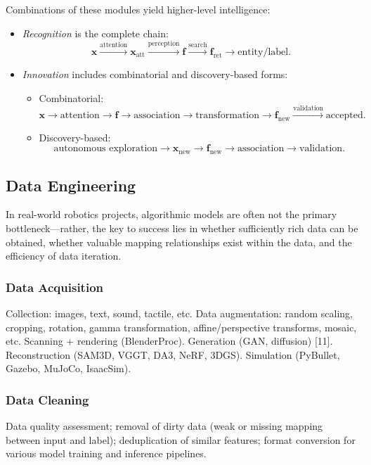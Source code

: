 \documentclass[12pt,a4paper]{article}
\begin{document}
Combinations of these modules yield higher-level intelligence:
\begin{itemize}
\item \emph{Recognition} is the complete chain:
\[
\mathbf{x} \xrightarrow{\text{attention}} \mathbf{x}_{\text{att}} \xrightarrow{\text{perception}} \mathbf{f} \xrightarrow{\text{search}} \mathbf{f}_{\text{ret}} \to \text{entity/label}.
\]
\item \emph{Innovation} includes combinatorial and discovery-based forms:
\begin{itemize}
\item Combinatorial: 
\[
\mathbf{x} \to \text{attention} \to \mathbf{f} \to \text{association} \to \text{transformation} \to \mathbf{f}_{\text{new}} \xrightarrow{\text{validation}} \text{accepted}.
\]
\item Discovery-based: 
\[
\text{autonomous exploration} \to \mathbf{x}_{\text{new}} \to \mathbf{f}_{\text{new}} \to \text{association} \to \text{validation}.
\]
\end{itemize}
\end{itemize}

\subsection{Data Engineering}
In real-world robotics projects, algorithmic models are often not the primary bottleneck—rather, the key to success lies in whether sufficiently rich data can be obtained, whether valuable mapping relationships exist within the data, and the efficiency of data iteration.

\subsubsection{Data Acquisition}
Collection: images, text, sound, tactile, etc.
Data augmentation: random scaling, cropping, rotation, gamma transformation, affine/perspective transforms, mosaic, etc.
Scanning + rendering (BlenderProc).
Generation (GAN, diffusion) [11].
Reconstruction (SAM3D, VGGT, DA3, NeRF, 3DGS).
Simulation (PyBullet, Gazebo, MuJoCo, IsaacSim).

\subsubsection{Data Cleaning}
Data quality assessment; removal of dirty data (weak or missing mapping between input and label); deduplication of similar features; format conversion for various model training and inference pipelines.
\end{document}
